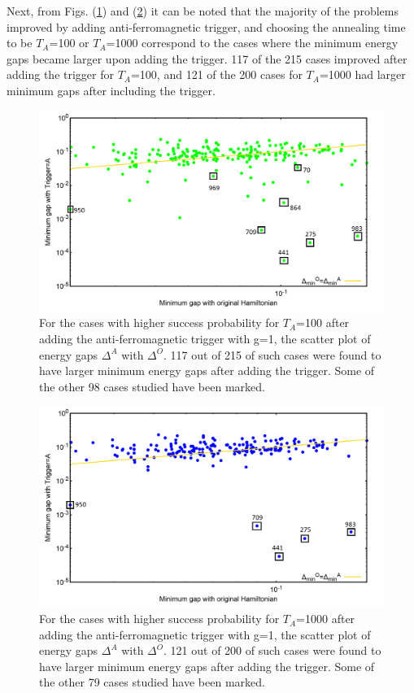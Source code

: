 \documentclass[../main.tex]{subfiles}
\begin{document}
Next, from Figs. (\ref{fig:a26}) and (\ref{fig:a27}) it can be noted that the majority of the problems improved by adding anti-ferromagnetic trigger, and choosing the annealing time to be $T_A$=100 or $T_A$=1000 correspond to the cases where the minimum energy gaps became larger upon adding the trigger. 117 of the   215 cases improved after adding the trigger for $T_A$=100, and 121 of the 200 cases for $T_A$=1000 had larger minimum gaps after including the trigger.
\begin{figure}[H]
\centering 
\includegraphics[scale=0.35]{selected_T100_g1.png}
\caption{For the cases with higher success probability for $T_A$=100 after adding the anti-ferromagnetic trigger with g=1, the scatter plot of energy gaps $\Delta^A $ with $\Delta^O$. 117 out of 215 of such cases were found to have larger minimum energy gaps after adding the trigger. Some of the other 98 cases studied have been marked.}
\label{fig:a26}
\end{figure}
\begin{figure}[H]
\centering 
\includegraphics[scale=0.35]{selected_T1000_g1.png}
\caption{For the cases with higher success probability for $T_A$=1000 after adding the anti-ferromagnetic trigger with g=1, the scatter plot of energy gaps $\Delta^A $ with $\Delta^O$. 121 out of 200 of such cases were found to have larger minimum energy gaps after adding the trigger. Some of the other 79 cases studied have been marked.}
\label{fig:a27}
\end{figure}
\end{document}
